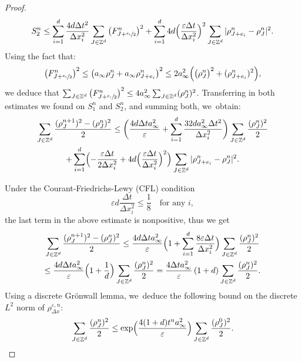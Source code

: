 \documentclass[JEP,XML,SOM,Unicode, NoFloatCountersInSection,published]{cedram}
\def\ZZ{\mathbb{Z}}
\def\eps{\varepsilon}
\def\dt{\Delta t}
\def\dx{\Delta x}
\theoremstyle{plain}
\theoremstyle{definition}
\begin{document}
\begin{proof}
\[
S_2^n \leq \sum_{i=1}^{d} \frac{4 d \dt^2}{\dx_i^2} \sum_{J \in \ZZ^d} \big(F_{J+ \sfrac{e_i}{2}}^n\big)^2 + \sum_{i=1}^{d} 4 d \Bigl(\frac{\eps\dt}{\dx_i^2}\Bigr)^2 \sum_{J \in \ZZ^d} |\rho_{J+e_i}^n - \rho_J^n|^2.
\]
Using the fact that:
\[
\big(F_{J+ \sfrac{e_i}{2}}^n\big)^2 \leq \big(a_\infty \rho_J^n + a_\infty \rho_{J+e_i}^n\big)^2 \leq 2a_\infty^2 \Big(\big(\rho_J^n\big)^2 +(\rho_{J+e_i}^n)^2\Big),
\]
we deduce that $\sum_{J \in \ZZ^d} \big(F_{J+ \sfrac{e_i}{2}}^n\big)^2 \leq 4a_\infty^2 \sum_{J\in\ZZ^d}(\rho_J^n)^2$. Transferring in both estimates we found on $S_1^n$ and $S_2^n$, and summing both, we~obtain:
\begin{multline}\label{eq:disH1estimate:1}
\sum_{J \in \ZZ^d} \frac{(\rho_J^{n+1})^2 -(\rho_J^n)^2}{2}\leq \biggl(\frac{4d\dt a_\infty^2}{\eps} + \sum_{i=1}^{d} \frac{32 d a_\infty^2\dt^2}{\dx_i^2}\biggr) \sum_{J\in\ZZ^d} \frac{(\rho_J^n)^2}{2} \\
+ \sum_{i=1}^{d} \Bigl(-\frac{\eps\dt}{2\dx_i^2} + 4 d \Bigl(\frac{\eps\dt}{\dx_i^2}\Bigr)^2\Bigr) \sum_{J \in \ZZ^d} |\rho_{J+e_i}^n - \rho_J^n|^2.
\end{multline}

Under the Courant-Friedrichs-Lewy (CFL) condition
\begin{equation*}
\eps d \frac{\dt}{\dx_i^2} \leq \frac 18 \quad \text{for any } i,
\end{equation*}
the last term in the above estimate is nonpositive, thus we get
\begin{multline*}
\sum_{J \in \ZZ^d} \frac{(\rho_J^{n+1})^2 -(\rho_J^n)^2}{2} \leq \frac{4d\dt a_\infty^2}{\eps}\Bigl(1 + \sum_{i=1}^{d} \frac{8\eps\dt}{\dx_i^2}\Bigr) \sum_{J\in\ZZ^d} \frac{(\rho_J^n)^2}{2} \\
\leq \frac{4d\dt a_\infty^2}{\eps}\Bigl(1 + \frac{1}{d}\Bigr) \sum_{J\in\ZZ^d} \frac{(\rho_J^n)^2}{2} = \frac{4\dt a_\infty^2}{\eps}\left(1 + d\right) \sum_{J\in\ZZ^d} \frac{(\rho_J^n)^2}{2}.
\end{multline*}
Using a discrete Grönwall lemma, we~deduce the following bound on the discrete $L^2$ norm of $\rho_{\dx}^{\eps,n}$:
\[
\sum_{J \in \ZZ^d} \frac{(\rho_J^n)^2}{2} \leq \exp\Bigl(\frac{4(1 + d)t^n a_\infty^2}{\eps}\Bigr) \sum_{J \in \ZZ^d} \frac{(\rho_J^0)^2}{2}.
\]


\end{proof}
\end{document}
